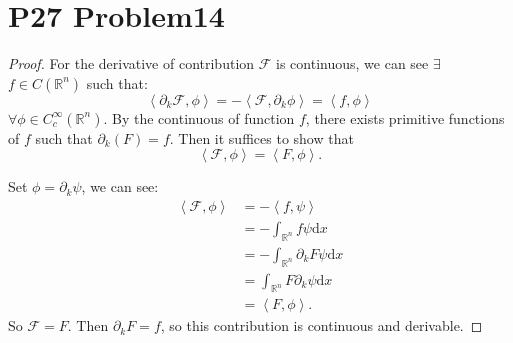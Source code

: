 \documentclass[a4paper]{ctexart}
\newcommand{\dif}{\mathrm{d}}
\newcommand{\innerprod}[2]{\left<#1,#2\right>}
\begin{document}
\section*{P27 Problem14}
\begin{proof}
For the derivative of contribution $\mathcal{F}$ is continuous, we can see $\exists$ $f\in C(\mathbb{R}^{n})$ such that:
\begin{equation}
    \left<\partial_{k}\mathcal{F},\phi\right>=-\innerprod{\mathcal{F}}{\partial_{k}\phi}=\innerprod{f}{\phi}
\end{equation}
$\forall\phi\in C_{c}^{\infty}(\mathbb{R}^{n})$. By the continuous of function $f$, there exists primitive functions of $f$ such that $\partial_{k}(F)=f$. Then it suffices to show that 
\begin{equation}
    \innerprod{\mathcal{F}}{\phi}=\innerprod{F}{\phi}.
\end{equation}

Set $\phi=\partial_{k}\psi$, we can see:
\begin{equation}
    \begin{aligned}
        \innerprod{\mathcal{F}}{\phi}&=-\innerprod{f}{\psi}\\
        &=-\int_{\mathbb{R}^{n}}f\psi\dif x\\
        &=-\int_{\mathbb{R}^{n}}\partial_{k}F\psi\dif x\\
        &=\int_{\mathbb{R}^{n}}F\partial_{k}\psi\dif x\\
        &=\innerprod{F}{\phi}.
    \end{aligned}
\end{equation}
So $\mathcal{F}=F$. Then $\partial_{k}F=f$, so this contribution is continuous and derivable.
\end{proof}
\end{document}
